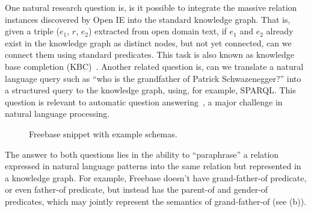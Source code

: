 One natural research question is, is it possible to integrate
the massive relation instances discovered by Open IE into the standard
knowledge graph. That is, given a triple ($e_1$, $r$, $e_2$) extracted from
open domain text, if $e_1$ and $e_2$ already exist in the knowledge
graph as distinct nodes, but not yet connected, can we connect them using
standard predicates. This task is also known as 
knowledge base completion (KBC)~\cite{}.
Another related question is, can we translate a natural
language query such as ``who is the grandfather of Patrick Schwazenegger?'' 
into a structured query to the knowledge graph, using, for example, SPARQL.
This question is relevant to automatic question 
answering~\cite{berant13, zou14, berant14, yao14, lao11}, 
a major challenge in natural language processing. 

\begin{figure}[th]
\centering {}
\label{fig:fb-schema}
\caption{Freebase snippet with example schemas.}
\end{figure}

The answer to both questions lies in the ability to ``paraphrase''
a relation expressed in natural language patterns into the same relation
but represented in a knowledge graph.
For example, Freebase doesn't have grand-father-of predicate, 
or even father-of predicate, but instead has the parent-of 
and gender-of predicates, which may jointly represent the semantics of
grand-father-of (see  (b)).  

